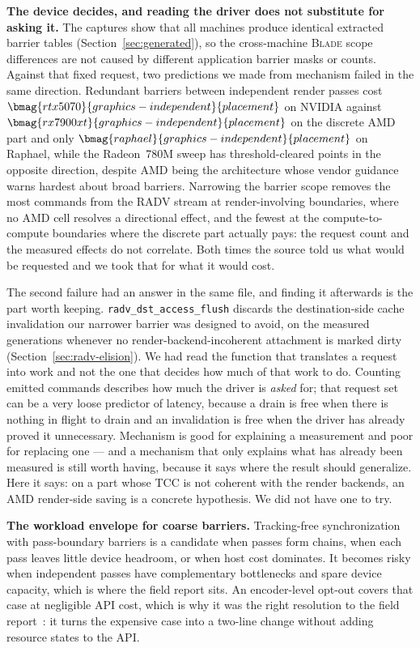\documentclass[10pt,twocolumn]{article}
\newcommand{\blade}{\textsc{Blade}}
\begin{document}
\textbf{The device decides, and reading the driver does not substitute for
asking it.} The captures show that all  machines
produce identical extracted barrier tables (Section~\ref{sec:generated}), so
the cross-machine \blade{} scope differences are not caused by different
application barrier masks or counts. Against that fixed request, two predictions we made from mechanism failed in
the same direction. Redundant barriers between independent render passes cost
$\bmag{rtx5070}{graphics-independent}{placement}$ on NVIDIA against
$\bmag{rx7900xt}{graphics-independent}{placement}$ on the discrete AMD part
and only $\bmag{raphael}{graphics-independent}{placement}$ on Raphael, while
the Radeon~780M sweep has threshold-cleared points in the opposite direction,
despite AMD being the architecture whose vendor guidance warns hardest about
broad barriers. Narrowing the barrier
scope removes the most commands from the RADV stream at render-involving
boundaries, where no AMD cell resolves a directional effect, and the fewest at
the compute-to-compute boundaries where the discrete part actually pays: the
request count and the measured effects do not correlate. Both times the source
told us what would be requested and we took that for what it would cost.

The second failure had an answer in the same file, and finding it afterwards is
the part worth keeping. \texttt{radv\_dst\_access\_flush} discards the
destination-side cache invalidation our narrower barrier was designed to avoid,
on the measured generations whenever no render-backend-incoherent attachment
is marked dirty
(Section~\ref{sec:radv-elision}). We had read the function that translates a
request into work and not the one that decides how much of that work to do.
Counting emitted commands describes how much the driver is \emph{asked} for;
that request set can be a very loose predictor of latency, because a drain is
free when there is nothing in flight to drain and an invalidation is free when
the driver has already proved it unnecessary. Mechanism is good for explaining
a measurement and poor for replacing one --- and a mechanism that only explains what has already been
measured is still worth having, because it says where the result should
generalize. Here it says: on a part whose TCC is not coherent with the render
backends, an AMD render-side saving is a concrete hypothesis. We did not have
one to try.

\textbf{The workload envelope for coarse barriers.} Tracking-free
synchronization with pass-boundary barriers is a candidate when passes form
chains, when each pass leaves little device headroom, or when host cost
dominates. It becomes risky when independent passes have complementary
bottlenecks and spare device capacity, which is where the field report sits. An
encoder-level opt-out covers that case at negligible API cost, which is why it
was the right resolution to the field report~\cite{blade-issue-343}: it turns
the expensive case into a two-line change without adding resource states to the
API.
\end{document}
